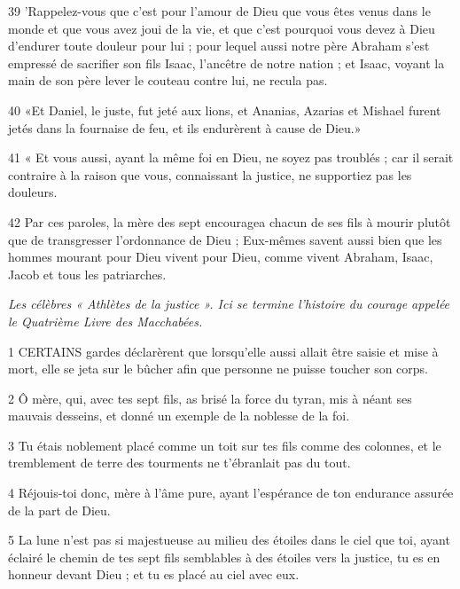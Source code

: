 \par 39 'Rappelez-vous que c'est pour l'amour de Dieu que vous êtes venus dans le monde et que vous avez joui de la vie, et que c'est pourquoi vous devez à Dieu d'endurer toute douleur pour lui ; pour lequel aussi notre père Abraham s'est empressé de sacrifier son fils Isaac, l'ancêtre de notre nation ; et Isaac, voyant la main de son père lever le couteau contre lui, ne recula pas.

\par 40 «Et Daniel, le juste, fut jeté aux lions, et Ananias, Azarias et Mishael furent jetés dans la fournaise de feu, et ils endurèrent à cause de Dieu.»

\par 41 « Et vous aussi, ayant la même foi en Dieu, ne soyez pas troublés ; car il serait contraire à la raison que vous, connaissant la justice, ne supportiez pas les douleurs.

\par 42 Par ces paroles, la mère des sept encouragea chacun de ses fils à mourir plutôt que de transgresser l'ordonnance de Dieu ; Eux-mêmes savent aussi bien que les hommes mourant pour Dieu vivent pour Dieu, comme vivent Abraham, Isaac, Jacob et tous les patriarches.




\par \textit{Les célèbres « Athlètes de la justice ». Ici se termine l'histoire du courage appelée le Quatrième Livre des Macchabées.}

\par 1 CERTAINS gardes déclarèrent que lorsqu'elle aussi allait être saisie et mise à mort, elle se jeta sur le bûcher afin que personne ne puisse toucher son corps.

\par 2 Ô mère, qui, avec tes sept fils, as brisé la force du tyran, mis à néant ses mauvais desseins, et donné un exemple de la noblesse de la foi.

\par 3 Tu étais noblement placé comme un toit sur tes fils comme des colonnes, et le tremblement de terre des tourments ne t'ébranlait pas du tout.

\par 4 Réjouis-toi donc, mère à l'âme pure, ayant l'espérance de ton endurance assurée de la part de Dieu.

\par 5 La lune n'est pas si majestueuse au milieu des étoiles dans le ciel que toi, ayant éclairé le chemin de tes sept fils semblables à des étoiles vers la justice, tu es en honneur devant Dieu ; et tu es placé au ciel avec eux.

